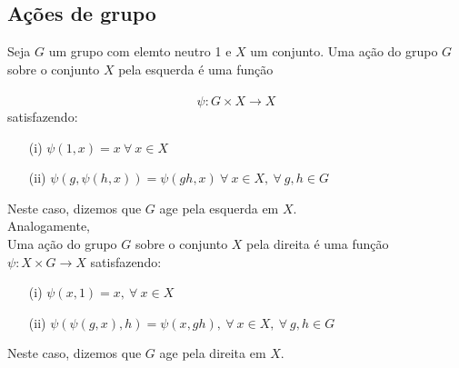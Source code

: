 \subsection{Ações de grupo}
\label{ações-de-grupo-def}


\begin{defi}
	Seja $G$ um grupo com elemto neutro 1 e $X$ um conjunto. Uma ação do grupo $G$ sobre o conjunto $X$ pela esquerda é uma função\\\\
 \[\psi: G\times X \longrightarrow X\] satisfazendo:
 
 \begin{itemize}
     \item[(i)] $\psi(1,x) = x \  \forall\  x \in X$
     \item[(ii)] $\psi(g,\psi(h,x)) = \psi(gh,x) \ \forall\ x \in X,\ \forall\ g,h \in G$
 \end{itemize}
 Neste caso, dizemos que $G$ age pela esquerda em $X$.\\
 

\noindent Analogamente,\\
 Uma ação do grupo $G$ sobre o conjunto $X$ pela direita é uma função\\
 $\psi: X\times G \longrightarrow X$ satisfazendo:
 
 \begin{itemize}
     \item[(i)] $\psi(x,1) = x ,\  \forall\  x \in X$
     \item[(ii)] $\psi(\psi(g,x), h) = \psi(x,gh), \ \forall\ x \in X,\ \forall\ g,h \in G$
 \end{itemize}
 Neste caso, dizemos que $G$ age pela direita em $X$.

\end{defi}


